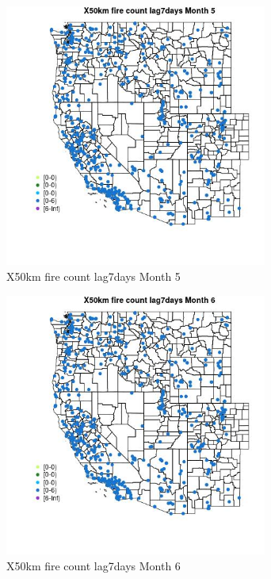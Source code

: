 \begin{figure} 
\centering  
\includegraphics[width=0.77\textwidth]{Code_Outputs/Report_ML_input_PM25_Step4_part_e_de_duplicated_aves_compiled_2019-05-14wNAs_MapObsMo5X50km_fire_count_lag7days.jpg} 
\caption{\label{fig:Report_ML_input_PM25_Step4_part_e_de_duplicated_aves_compiled_2019-05-14wNAsMapObsMo5X50km_fire_count_lag7days}X50km fire count lag7days Month 5} 
\end{figure} 
 

\begin{figure} 
\centering  
\includegraphics[width=0.77\textwidth]{Code_Outputs/Report_ML_input_PM25_Step4_part_e_de_duplicated_aves_compiled_2019-05-14wNAs_MapObsMo6X50km_fire_count_lag7days.jpg} 
\caption{\label{fig:Report_ML_input_PM25_Step4_part_e_de_duplicated_aves_compiled_2019-05-14wNAsMapObsMo6X50km_fire_count_lag7days}X50km fire count lag7days Month 6} 
\end{figure} 
 

